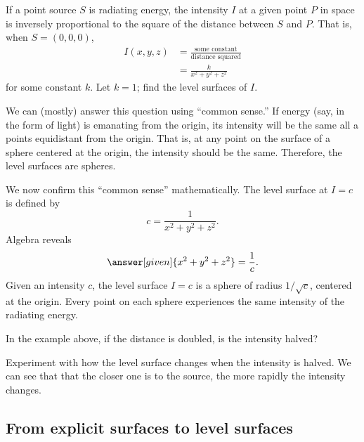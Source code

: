 \documentclass{ximera}
\begin{document}
\begin{example}
  If a point source $S$ is radiating energy, the intensity $I$ at a
  given point $P$ in space is inversely proportional to the square of
  the distance between $S$ and $P$. That is, when $S=(0,0,0)$,
  \begin{align*}
  I(x,y,z) &= \frac{\text{some constant}}{\text{distance squared}}\\
  &=\frac{k}{x^2+y^2+z^2}
  \end{align*}
  for some constant $k$.  Let $k=1$; find the level surfaces of $I$.
  \begin{explanation}
    We can (mostly) answer this question using ``common sense.'' If
    energy (say, in the form of light) is emanating from the origin,
    its intensity will be the same all a points equidistant from the
    origin. That is, at any point on the surface of a sphere centered
    at the origin, the intensity should be the same. Therefore, the
    level surfaces are spheres.
    
    We now confirm this ``common sense'' mathematically. The level
    surface at $I=c$ is defined by
    \[
    c = \frac{1}{x^2+y^2+z^2}.
    \]
    Algebra reveals
    \[
    \answer[given]{x^2+y^2+z^2} = \frac{1}{c}.
    \]
    Given an intensity $c$, the level surface $I=c$ is a sphere of
    radius $1/\sqrt{c}$, centered at the origin. Every point on each
    sphere experiences the same intensity of the radiating energy.
  \end{explanation}
\end{example}

\begin{question}
  In the example above, if the distance is doubled, is the intensity
  halved?
  \begin{prompt}
  \begin{multipleChoice}
  \end{multipleChoice}
  \begin{feedback}
    Experiment with how the level surface changes when the intensity
    is halved. We can see that that the closer one is to the source,
    the more rapidly the intensity changes.
  \end{feedback}
  \end{prompt}
\end{question}


\subsection{From explicit surfaces to level surfaces}
\end{document}

